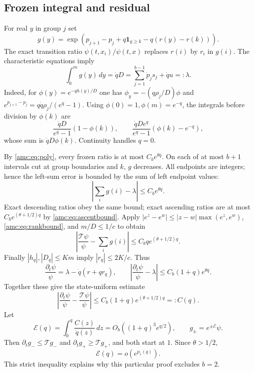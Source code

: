 \documentclass[11pt,letterpaper]{article}
\theoremstyle{remark}\newtheorem{remark}[theorem]{Remark}
\newcommand{\TT}{\mathcal T}
\newcommand{\one}{\mathbf 1}
\newcommand{\Err}{\mathcal E}
\begin{document}
\subsection{Frozen integral and residual}
For real $y$ in group $j$ set
\[
 g(y)=\exp\left(p_{j+1}-p_j+q\one_{y\ge k}-q(r(y)-r(k))\right).
\]
The exact transition ratio $\psi(t,x_i)/\psi(t,x)$ replaces $r(i)$ by $r_i$ in $g(i)$. The characteristic equations imply
\begin{equation}\label{amc:eq:frozen}
 \int_0^m g(y)\,dy=\dot qD=\sum_{j=1}^{b-1}\dot p_js_j+\dot q u=:\lambda.
\end{equation}
Indeed, for $\phi(y)=e^{-qh(y)/D}$ one has
$\phi_y=-(q\rho_j/D)\phi$ and
$e^{p_{j+1}-p_j}=q\dot q\rho_j/(e^q-1)$.
Using $\phi(0)=1,\phi(m)=e^{-q}$, the integrals before division by $\phi(k)$ are
\[
 \frac{\dot qD}{e^q-1}(1-\phi(k)),\qquad
 \frac{\dot qD e^q}{e^q-1}(\phi(k)-e^{-q}),
\]
whose sum is $\dot qD\phi(k)$. Continuity handles $q=0$.

By \eqref{amc:eq:poly}, every frozen ratio is at most $C_be^{\theta q}$. On each of at most $b+1$ intervals cut at group boundaries and $k$, $g$ decreases. All endpoints are integers; hence the left-sum error is bounded by the sum of left endpoint values:
\[
 \left|\sum_i g(i)-\lambda\right|\le C_be^{\theta q}.
\]
Exact descending ratios obey the same bound; exact ascending ratios are at most $C_be^{(\theta+1/2)q}$ by \eqref{amc:eq:ascentbound}. Apply
$|e^z-e^w|\le|z-w|\max(e^z,e^w)$, \eqref{amc:eq:rankbound}, and $m/D\le1/c$ to obtain
\[
 \left|\frac{\TT\psi}{\psi}-\sum_i g(i)\right|
 \le C_b q e^{(\theta+1/2)q}.
\]
Finally $|h_q|,|D_q|\le Km$ imply $|r_q|\le2K/c$. Thus
\[
 \frac{\partial_t\psi}{\psi}=\lambda-\dot q(r+qr_q),
 \qquad
 \left|\frac{\partial_t\psi}{\psi}-\lambda\right|
 \le C_b(1+q)e^{\theta q}.
\]
Together these give the state-uniform estimate
\begin{equation}\label{amc:eq:residual}
 \left|\frac{\partial_t\psi}{\psi}-\frac{\TT\psi}{\psi}\right|
 \le C_b(1+q)e^{(\theta+1/2)q}=:C(q).
\end{equation}
Let
\begin{equation}\label{amc:eq:Err}
 \Err(q)=\int_0^q\frac{C(z)}{\dot q(z)}\,dz
 =O_b((1+q)^3e^{q/2}),\qquad g_\pm=e^{\pm\Err}\psi.
\end{equation}
Then $\partial_tg_-\le\TT g_-$ and $\partial_tg_+\ge\TT g_+$, and both start at $1$. Since $\theta>1/2$,
\begin{equation}\label{amc:eq:smaller}
 \Err(q)=o(e^{p_1(q)}).
\end{equation}
This strict inequality explains why this particular proof excludes $b=2$.
\end{document}
